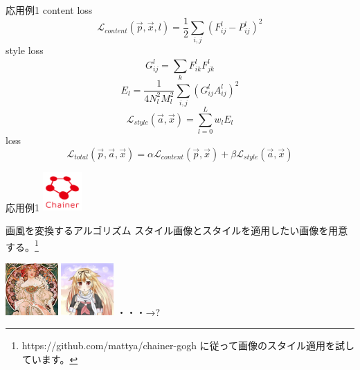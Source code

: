 \documentclass[12pt, unicode]{beamer}
\begin{document}
\begin{frame}{応用例1}
content loss
\begin{equation}
\mathcal{L}_{content}(\vec{p}, \vec{x}, l)=\frac{1}{2}\sum_{i,j}^{}(F_{ij}^{l}-P_{ij}^{l})^2
\end{equation}
style loss
\begin{equation}
G_{ij}^{l}=\sum_{k}^{}F_{ik}^{l}F_{jk}^{l}
\end{equation}
\begin{equation}
E_{l}=\frac{1}{4N_{l}^{2}M_{l}^{2}}\sum_{i,j}^{}(G_{ij}^{l}A_{ij}^{l})^2
\end{equation}
\begin{equation}
\mathcal{L}_{style}(\vec{a}, \vec{x})=\sum_{l=0}^{L}w_{l}E_{l}
\end{equation}
loss
\begin{equation}
\mathcal{L}_{total}(\vec{p}, \vec{a}, \vec{x})=\alpha\mathcal{L}_{content}(\vec{p}, \vec{x})+\beta\mathcal{L}_{style}(\vec{a}, \vec{x})
\end{equation}
\end{frame}

\begin{frame}{応用例1}
\includegraphics[clip,width=1.5cm]{image/chainer_logo.png}
\begin{block}{画風を変換するアルゴリズム}
スタイル画像とスタイルを適用したい画像を用意する。\footnote[frame]{https://github.com/mattya/chainer-gogh に従って画像のスタイル適用を試しています。}
\end{block}
\includegraphics[clip,width=2.0cm]{image/style_6.png}
\includegraphics[clip,width=2.0cm]{image/yuudachi_400x400.png}
・・・→\Large{?}
\end{frame}
\end{document}

